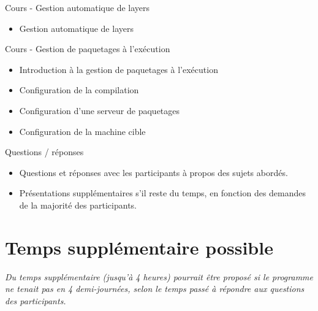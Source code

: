 \documentclass[a4paper,12pt,obeyspaces,spaces,hyphens]{article}
\begin{document}
\feagendatwocolumn
{Cours - Gestion automatique de layers}
{
  \begin{itemize}
  \item Gestion automatique de layers
  \end{itemize}
}
{Cours - Gestion de paquetages à l'exécution}
{
  \begin{itemize}
  \item Introduction à la gestion de paquetages à l'exécution
  \item Configuration de la compilation
  \item Configuration d'une serveur de paquetages
  \item Configuration de la machine cible
  \end{itemize}
}

\feagendaonecolumn
{Questions / réponses}
{
  \begin{itemize}
  \item Questions et réponses avec les participants à propos des sujets abordés.
  \item Présentations supplémentaires s'il reste du temps, en fonction des demandes
        de la majorité des participants.
  \end{itemize}
}

\section{Temps supplémentaire possible}

{\em Du temps supplémentaire (jusqu'à 4 heures) pourrait être proposé si le programme ne tenait
     pas en 4 demi-journées, selon le temps passé à répondre aux questions des participants.}
\end{document}
